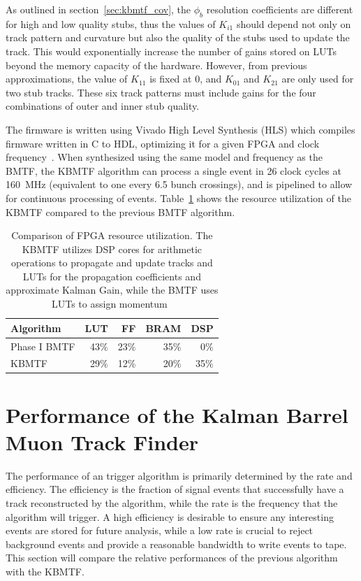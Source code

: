 As outlined in section~\ref{sec:kbmtf_cov}, the $\phi_b$ resolution coefficients are different for high and low quality stubs, thus the values of $K_{i1}$ should depend not only on track pattern and curvature but also the quality of the stubs used to update the track. This would exponentially increase the number of gains stored on LUTs beyond the memory capacity of the hardware. However, from previous approximations, the value of $K_{11}$ is fixed at 0, and $K_{01}$ and $K_{21}$ are only used for two stub tracks. These six track patterns must include gains for the four combinations of outer and inner stub quality.

The firmware is written using Vivado High Level Synthesis (HLS) which compiles firmware written in C to HDL, optimizing it for a given FPGA and clock frequency~\cite{Bachtis:2648953}. When synthesized using the same model and frequency as the BMTF, the KBMTF algorithm can process a single event in 26 clock cycles at 160~\unit{MHz} (equivalent to one every 6.5 bunch crossings), and is pipelined to allow for continuous processing of events. Table~\ref{tab:kmtfFW} shows the resource utilization of the KBMTF compared to the previous BMTF algorithm.

\begin{table} [h!]
	\begin{centering}
	\begin{tabular}{|l|r r r r|}
	\hline
	Algorithm & LUT & FF & BRAM & DSP \\
	\hline
	Phase I BMTF & 43\% & 23\% & 35\% & 0\%\\
	KBMTF & 29\% & 12\% & 20\% & 35\% \\
	\hline 
	\end{tabular}
	\caption[Comparison of FPGA resource utilization. The KBMTF utilizes DSP cores for arithmetic operations to propagate and update tracks and LUTs for the propagation coefficients and approximate Kalman Gain, while the BMTF uses LUTs to assign momentum~\cite{Bachtis:2648953}]
	{Comparison of FPGA resource utilization. The KBMTF utilizes DSP cores for arithmetic operations to propagate and update tracks and LUTs for the propagation coefficients and approximate Kalman Gain, while the BMTF uses LUTs to assign momentum~\cite{Bachtis:2648953}}
	\end{centering}
	\label{tab:kmtfFW}
\end{table}

\section{Performance of the Kalman Barrel Muon Track Finder} \label{sec:kmtf_performance}
The performance of an trigger algorithm is primarily determined by the rate and efficiency. The efficiency is the fraction of signal events that successfully have a track reconstructed by the algorithm, while the rate is the frequency that the algorithm will trigger. A high efficiency is desirable to ensure any interesting events are stored for future analysis, while a low rate is crucial to reject background events and provide a reasonable bandwidth to write events to tape. This section will compare the relative performances of the previous algorithm with the KBMTF.

